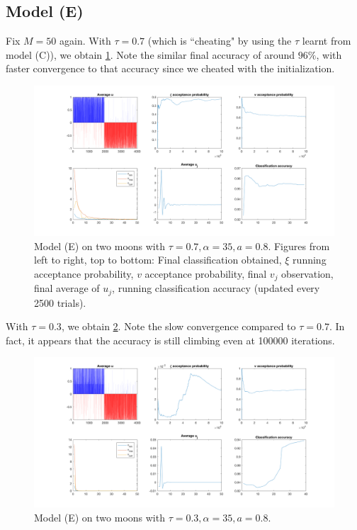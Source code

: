 \documentclass{siamart1116}
\begin{document}
        \subsection{Model (E)}
            Fix $M=50$ again. 
            With $\tau = 0.7$ (which is ``cheating" by using the $\tau$ learnt from model (C)), we obtain \cref{fig:model_e_mnist_t=0.7}. Note the similar final accuracy of around $96\%$, with faster convergence to that accuracy since we cheated with the initialization.
            \begin{figure}[!htb]
            \caption{\label{fig:model_e_mnist_t=0.7}Model (E) on two moons with $\tau=0.7,\alpha=35,a=0.8$. Figures from left to right, top to bottom: Final classification obtained, $\xi$ running acceptance probability, $v$ acceptance probability, final $v_j$ observation, final average of $u_j$, running classification accuracy (updated every 2500 trials).}
            \includegraphics[width=\linewidth]{mnist/learn_v/t=0_7.png}
            \end{figure}

            With $\tau = 0.3$, we obtain \cref{fig:model_e_mnist_t=0.3}. Note the slow convergence compared to $\tau=0.7$. In fact, it appears that the accuracy is still climbing even at 100000 iterations.
            \begin{figure}[!htb]
            \caption{\label{fig:model_e_mnist_t=0.3}Model (E) on two moons with $\tau=0.3,\alpha=35,a=0.8$.}
            \includegraphics[width=\linewidth]{mnist/learn_v/t=0_3.png}
            \end{figure}
\end{document}
